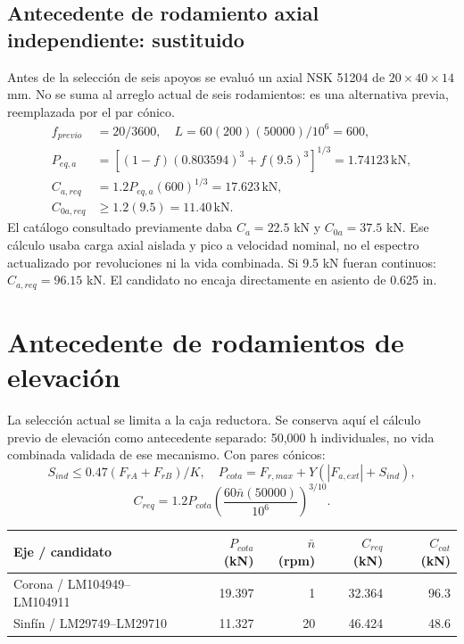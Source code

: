 \documentclass[11pt,a4paper]{article}
\begin{document}
\subsection{Antecedente de rodamiento axial independiente: sustituido}
Antes de la selección de seis apoyos se evaluó un axial NSK 51204 de $20\times40\times14$ mm. No se suma al arreglo actual de seis rodamientos: es una alternativa previa, reemplazada por el par cónico.
\begin{align*}
f_{previo}&=20/3600,\quad L=60(200)(50000)/10^6=600,\\
P_{eq,a}&=[(1-f)(0.803594)^3+f(9.5)^3]^{1/3}=1.74123\,\mathrm{kN},\\
C_{a,req}&=1.2P_{eq,a}(600)^{1/3}=17.623\,\mathrm{kN},\\
C_{0a,req}&\geq1.2(9.5)=11.40\,\mathrm{kN}.
\end{align*}
El catálogo consultado previamente daba $C_a=22.5$ kN y $C_{0a}=37.5$ kN. Ese cálculo usaba carga axial aislada y pico a velocidad nominal, no el espectro actualizado por revoluciones ni la vida combinada. Si 9.5 kN fueran continuos: $C_{a,req}=96.15$ kN. El candidato no encaja directamente en asiento de 0.625 in.

\section{Antecedente de rodamientos de elevación}
La selección actual se limita a la caja reductora. Se conserva aquí el cálculo previo de elevación como antecedente separado: 50,000 h individuales, no vida combinada validada de ese mecanismo. Con pares cónicos:
\[
S_{ind}\leq0.47(F_{rA}+F_{rB})/K,\quad
P_{cota}=F_{r,max}+Y(|F_{a,ext}|+S_{ind}),
\]
\[
C_{req}=1.2P_{cota}\left(\frac{60\bar n(50000)}{10^6}\right)^{3/10}.
\]

\begin{center}\small\begin{tabular}{lrrrr}\toprule

Eje / candidato & $P_{cota}$ (kN) & $\bar n$ (rpm) & $C_{req}$ (kN) & $C_{cat}$ (kN) \\ \midrule

Corona / LM104949--LM104911 & 19.397 & 1 & 32.364 & 96.3 \\

Sinfín / LM29749--LM29710 & 11.327 & 20 & 46.424 & 48.6 \\

\bottomrule\end{tabular}\end{center}
\end{document}
